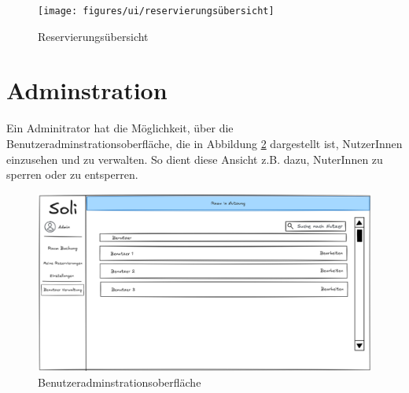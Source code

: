 \begin{figure}[ht]
    \texttt{[image: figures/ui/reservierungsübersicht]}
    \caption{Reservierungsübersicht}
    \label{fig:overview}
\end{figure}
\clearpage

\section{Adminstration}
Ein Adminitrator hat die Möglichkeit, über die Benutzeradminstrationsoberfläche,
die in Abbildung \ref{fig:adminuser} dargestellt ist, NutzerInnen einzusehen und zu verwalten.
So dient diese Ansicht z.B. dazu, NuterInnen zu sperren oder zu entsperren.

\begin{figure}[ht]
    \centering
    \includegraphics[scale=0.15]{figures/ui/useradminui}
    \caption{Benutzeradminstrationsoberfläche}
    \label{fig:adminuser}
\end{figure}

